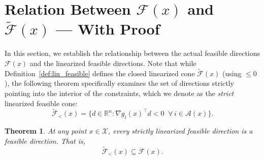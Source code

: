 \documentclass[11pt]{article}
\theoremstyle{definition}
\theoremstyle{plain}
\newtheorem{theorem}{Theorem}
\theoremstyle{remark}
\begin{document}
\section{Relation Between \texorpdfstring{$\mathcal{F}(x)$}{F(x)} and \texorpdfstring{$\widetilde{\mathcal{F}}(x)$}{Ftilde(x)} — With Proof}

In this section, we establish the relationship between the actual feasible directions $\mathcal{F}(x)$ and the linearized feasible directions. Note that while Definition~\ref{def:lin_feasible} defines the closed linearized cone $\widetilde{\mathcal{F}}(x)$ (using $\leq 0$), the following theorem specifically examines the set of directions strictly pointing into the interior of the constraints, which we denote as the \emph{strict} linearized feasible cone:
\[
  \widetilde{\mathcal{F}}_{<}(x) = \{d \in \mathbb{R}^n : \nabla g_i(x)^\top d < 0 \;\; \forall\, i \in \mathcal{A}(x)\}.
\]

\begin{theorem}
  At any point $x \in \mathcal{X}$, every strictly linearized feasible direction is a feasible direction. That is, 
  \[
    \widetilde{\mathcal{F}}_{<}(x) \subseteq \mathcal{F}(x).
  \]
\end{theorem}
\end{document}
